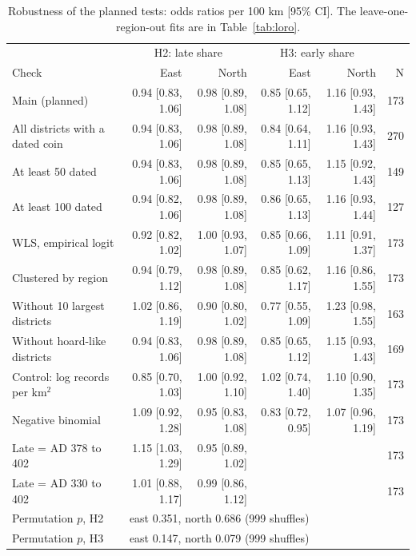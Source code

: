 \documentclass[11pt,a4paper]{article}
\begin{document}
\begin{table}[tbp]\centering\scriptsize\caption{Robustness of the planned tests: odds ratios per 100 km [95\% CI]. The leave-one-region-out fits are in Table~\ref{tab:loro}.}\label{tab:robust}\begin{tabular}{lrrrrr}\toprule & \multicolumn{2}{c}{H2: late share} & \multicolumn{2}{c}{H3: early share} & \\ Check & East & North & East & North & N\\\midrule
Main (planned) & 0.94 [0.83, 1.06] & 0.98 [0.89, 1.08] & 0.85 [0.65, 1.12] & 1.16 [0.93, 1.43] & 173\\
All districts with a dated coin & 0.94 [0.83, 1.06] & 0.98 [0.89, 1.08] & 0.84 [0.64, 1.11] & 1.16 [0.93, 1.43] & 270\\
At least 50 dated & 0.94 [0.83, 1.06] & 0.98 [0.89, 1.08] & 0.85 [0.65, 1.13] & 1.15 [0.92, 1.43] & 149\\
At least 100 dated & 0.94 [0.82, 1.06] & 0.98 [0.89, 1.08] & 0.86 [0.65, 1.13] & 1.16 [0.93, 1.44] & 127\\
WLS, empirical logit & 0.92 [0.82, 1.02] & 1.00 [0.93, 1.07] & 0.85 [0.66, 1.09] & 1.11 [0.91, 1.37] & 173\\
Clustered by region & 0.94 [0.79, 1.12] & 0.98 [0.89, 1.08] & 0.85 [0.62, 1.17] & 1.16 [0.86, 1.55] & 173\\
Without 10 largest districts & 1.02 [0.86, 1.19] & 0.90 [0.80, 1.02] & 0.77 [0.55, 1.09] & 1.23 [0.98, 1.55] & 163\\
Without hoard-like districts & 0.94 [0.83, 1.06] & 0.98 [0.89, 1.08] & 0.85 [0.65, 1.12] & 1.15 [0.93, 1.43] & 169\\
Control: log records per km$^2$ & 0.85 [0.70, 1.03] & 1.00 [0.92, 1.10] & 1.02 [0.74, 1.40] & 1.10 [0.90, 1.35] & 173\\
Negative binomial & 1.09 [0.92, 1.28] & 0.95 [0.83, 1.08] & 0.83 [0.72, 0.95] & 1.07 [0.96, 1.19] & 173\\
Late = AD 378 to 402 & 1.15 [1.03, 1.29] & 0.95 [0.89, 1.02] &  &  & 173\\
Late = AD 330 to 402 & 1.01 [0.88, 1.17] & 0.99 [0.86, 1.12] &  &  & 173\\
\midrule
Permutation $p$, H2 & \multicolumn{4}{l}{east 0.351, north 0.686 (999 shuffles)} & \\
Permutation $p$, H3 & \multicolumn{4}{l}{east 0.147, north 0.079 (999 shuffles)} & \\
\bottomrule\end{tabular}\end{table}
\end{document}
